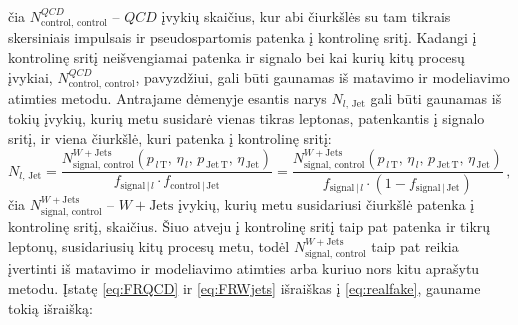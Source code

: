 \documentclass[a4paper, 12pt, oneside]{article}
\newcommand{\WJets}{W\! +\!\mathrm{Jets}}
\newcommand{\QCD}{QC\! D}
\newlength\q
\begin{document}
čia $N^{\QCD}_{\mathrm{control, \, control}}$ -- $\QCD$ įvykių skaičius, kur abi čiurkšlės su tam tikrais skersiniais impulsais ir
pseudospartomis patenka į kontrolinę sritį.
Kadangi į kontrolinę sritį neišvengiamai patenka ir signalo bei kai kurių kitų procesų įvykiai, $N^{\QCD}_{\mathrm{control, \, control}}$,
pavyzdžiui, gali būti gaunamas iš matavimo ir modeliavimo atimties metodu.
Antrajame dėmenyje esantis narys $N_{l, \, \mathrm{Jet}}$ gali būti gaunamas iš tokių įvykių,
kurių metu susidarė vienas tikras leptonas, patenkantis į signalo sritį, ir viena čiurkšlė, kuri patenka į kontrolinę sritį:
\begin{equation}
	\label{eq:FRWjets}
	N_{l, \, \mathrm{Jet}} =
	\frac{N^{\WJets}_{\mathrm{signal, \, control}}(p_{\, l\,\mathrm{T}}, \, \eta_{\, l}, \, p_{\mathrm{\, Jet\,T}}, \, \eta_{\,\mathrm{Jet}})}
	{f_{\mathrm{signal} \,| \, l}\cdot
	f_{\mathrm{control} \,| \, \mathrm{Jet}}} =
	\frac{N^{\WJets}_{\mathrm{signal, \, control}}(p_{\, l\,\mathrm{T}}, \, \eta_{\, l}, \, p_{\mathrm{\, Jet\,T}}, \, \eta_{\,\mathrm{Jet}})}
	{f_{\mathrm{signal} \,| \, l}\cdot
	\left( 1 - f_{\mathrm{signal} \,| \, \mathrm{Jet}} \right)}	\, ,
\end{equation}
čia $N^{\WJets}_{\mathrm{signal, \, control}}$ -- $\WJets$ įvykių, kurių metu susidariusi čiurkšlė patenka į kontrolinę sritį, skaičius.
Šiuo atveju į kontrolinę sritį taip pat patenka ir tikrų leptonų, susidariusių kitų procesų metu, todėl $N^{\WJets}_{\mathrm{signal, \, control}}$
taip pat reikia įvertinti iš matavimo ir modeliavimo atimties arba kuriuo nors kitu aprašytu metodu.
Įstatę \eqref{eq:FRQCD} ir \eqref{eq:FRWjets} išraiškas į \eqref{eq:realfake}, gauname tokią išraišką:
\end{document}
